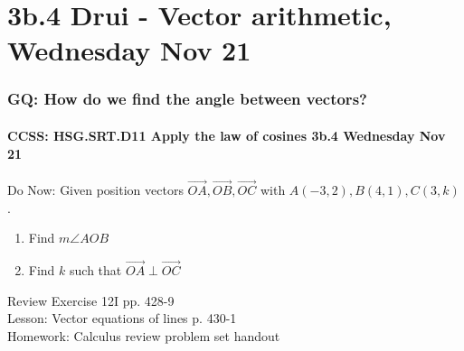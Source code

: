 \documentclass{beamer}
\begin{document}
    \section{3b.4 Drui - Vector arithmetic, Wednesday Nov 21}
      \frame
      {
        \frametitle{GQ: How do we find the angle between vectors?}
        \framesubtitle{CCSS: HSG.SRT.D11 Apply the law of cosines \qquad \alert{3b.4 Wednesday Nov 21}}

        \begin{block}{Do Now: Given position vectors $\overrightarrow{OA}, \overrightarrow{OB}, \overrightarrow{OC}$ with $A(-3,2),B(4,1),C(3,k)$.}
            \begin{center}
            \end{center}
          \begin{enumerate}
              \item Find $m\angle AOB$
              \item Find $k$ such that $\overrightarrow{OA} \perp \overrightarrow{OC}$
          \end{enumerate}
        \end{block}

        Review Exercise 12I pp. 428-9\\
        Lesson: Vector equations of lines p. 430-1\\
        Homework: Calculus review problem set handout
      }
\end{document}
